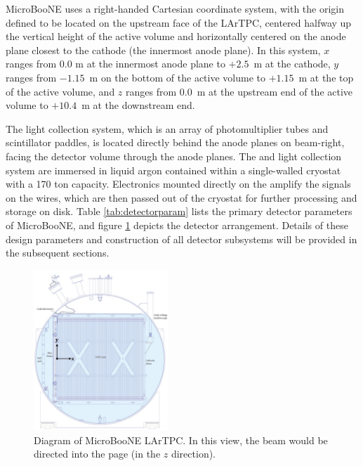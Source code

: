 MicroBooNE uses a right-handed Cartesian coordinate system, with the origin defined to be located on the upstream face of the LArTPC, centered halfway up the vertical height of the active volume and horizontally centered on the anode plane closest to the cathode (the innermost anode plane).  In this system, $x$ ranges from 0.0 m at the innermost anode plane to $+2.5$~m at the cathode, $y$ ranges from $-1.15$~m on the bottom of the active volume to $+1.15$~m at the top of the active volume, and $z$ ranges from 0.0~m at the upstream end of the active volume to $+10.4$~m at the downstream end.  

The light collection system, which is an array of photomultiplier tubes and scintillator paddles, is located directly behind the anode planes on beam-right, facing the detector volume through the anode planes.  The \lartpc and light collection system are immersed in liquid argon contained within a single-walled cryostat with a 170 ton capacity.  Electronics mounted directly on the \lartpc amplify the signals on the wires, which are then passed out of the cryostat for further processing and storage on disk.  Table \ref{tab:detectorparam} lists the primary detector parameters of MicroBooNE, and figure \ref{fig:microboonetpc} depicts the detector arrangement. Details of these design parameters and construction of all detector subsystems will be provided in the subsequent sections.

\begin{figure}
\centering 
\includegraphics[width=0.45\textwidth]{figures/microboone_tpc_diagram.jpg}
\caption{Diagram of MicroBooNE LArTPC.  In this view, the beam would be directed into the page (in the $z$ direction).}
\label{fig:microboonetpc}
\end{figure}




